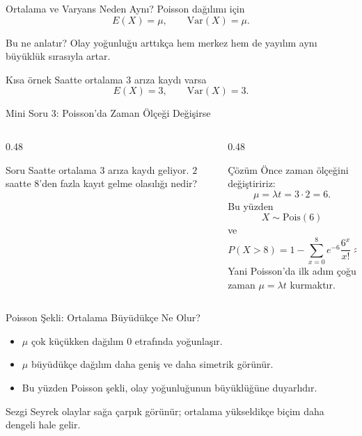 \documentclass[light]{lutbeamer}
\begin{document}
\begin{frame}{Ortalama ve Varyans Neden Aynı?}
    \small
    Poisson dağılımı için
    \[
    E(X)=\mu, \qquad \mathrm{Var}(X)=\mu.
    \]

    \begin{block}{Bu ne anlatır?}
        Olay yoğunluğu arttıkça hem merkez hem de yayılım aynı büyüklük sırasıyla artar.
    \end{block}

    \begin{exampleblock}{Kısa örnek}
        Saatte ortalama \(3\) arıza kaydı varsa
        \[
        E(X)=3, \qquad \mathrm{Var}(X)=3.
        \]
    \end{exampleblock}
\end{frame}

\begin{frame}{Mini Soru 3: Poisson'da Zaman Ölçeği Değişirse}
    \scriptsize
    \begin{columns}[T,onlytextwidth]
        \begin{column}{0.48\textwidth}
            \begin{block}{Soru}
                Saatte ortalama \(3\) arıza kaydı geliyor.
                \(2\) saatte \(8\)'den fazla kayıt gelme olasılığı nedir?
            \end{block}
        \end{column}
        \begin{column}{0.48\textwidth}
            \begin{exampleblock}{Çözüm}
                Önce zaman ölçeğini değiştiririz:
                \[
                \mu=\lambda t=3\cdot 2=6.
                \]
                Bu yüzden
                \[
                X\sim \text{Pois}(6)
                \]
                ve
                \[
                P(X>8)=1-\sum_{x=0}^{8}e^{-6}\frac{6^x}{x!}\approx 0.1528.
                \]
                Yani Poisson'da ilk adım çoğu zaman \(\mu=\lambda t\) kurmaktır.
            \end{exampleblock}
        \end{column}
    \end{columns}
\end{frame}

\begin{frame}{Poisson Şekli: Ortalama Büyüdükçe Ne Olur?}
    \small
    \begin{itemize}
        \item \(\mu\) çok küçükken dağılım \(0\) etrafında yoğunlaşır.
        \item \(\mu\) büyüdükçe dağılım daha geniş ve daha simetrik görünür.
        \item Bu yüzden Poisson şekli, olay yoğunluğunun büyüklüğüne duyarlıdır.
    \end{itemize}

    \begin{block}{Sezgi}
        Seyrek olaylar sağa çarpık görünür; ortalama yükseldikçe biçim daha dengeli hale gelir.
    \end{block}
\end{frame}
\end{document}

